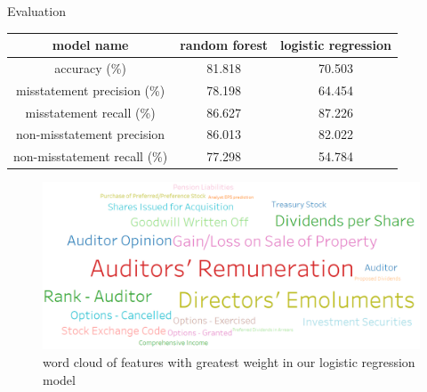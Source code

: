 \documentclass[final]{beamer}
\newlength{\onecolwid}
\begin{document}
\begin{frame}[t]
\begin{columns}[t]
\begin{column}{\onecolwid}
\begin{alertblock}{Evaluation}
\begin{center}
\begin{tabular}{c|c|c} 
\hline
model name & random forest & logistic regression\\
\hline
accuracy (\%) & 81.818 & 70.503\\
\hline
misstatement precision (\%) & 78.198 & 64.454\\
\hline
misstatement recall (\%) & 86.627 & 87.226\\ 
\hline
non-misstatement precision & 86.013 & 82.022\\
\hline
non-misstatement recall (\%) & 77.298 & 54.784\\
\hline
\end{tabular}
\end{center}


\end{alertblock}

\begin{figure}
\includegraphics[width=1.0\linewidth]{v3_word_cloud_logistic_regression}
\caption{word cloud of features with greatest weight in our logistic regression model}
\end{figure}


\end{column}
\end{columns}
\end{frame}
\end{document}
